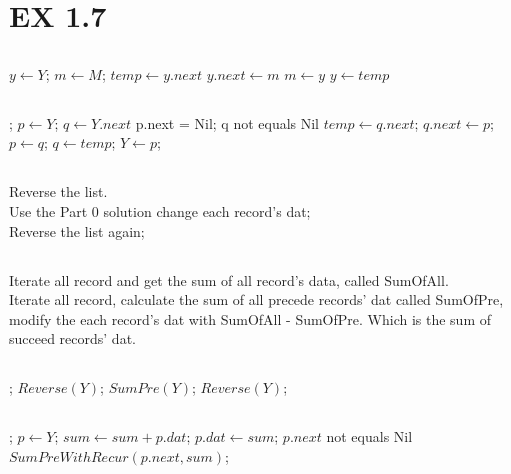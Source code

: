 \section{EX 1.7}
\subsection{}
\Prog\p     %
$y \leftarrow Y$;\p
$m \leftarrow M$;\p
$temp \leftarrow y.next$\p
$y.next \leftarrow m$\p
$m \leftarrow y$\p
$y \leftarrow temp$\qq
\Fini

\subsection{}
\Prog     %
; \qq 
$p \leftarrow Y$;\p
$q \leftarrow Y.next$\p
p.next = Nil;\p
\While q not equals Nil \Do\p
$temp \leftarrow q.next$;\p
$q.next \leftarrow p$;\p
$p \leftarrow q$;\p
$q \leftarrow temp$;\p
\Endwhile\p
$Y \leftarrow p$;\qq
\Fini


\subsection{}

Reverse the list.\\
Use the Part 0 solution change each record's dat;\\
Reverse the list again;


\subsection{}
Iterate all record and get the sum of all record's data, called SumOfAll.\\
Iterate all record, calculate the sum of all precede records' dat called SumOfPre, modify the each record's dat with SumOfAll - SumOfPre. Which is the sum of succeed records' dat.

\subsection{}
\Prog\qq     %
; \p
$Reverse(Y)$;\p
$SumPre(Y)$;\p
$Reverse(Y)$;\qq
\Fini

\subsection{}
\Prog\qq     %
; \p
$p \leftarrow Y$;\p
$sum \leftarrow sum + p.dat$;\p
$p.dat \leftarrow sum$;\p
\If $p.next$ not equals Nil \Then\p
$SumPreWithRecur(p.next, sum)$;\p
\Endif\qq
\Fini

